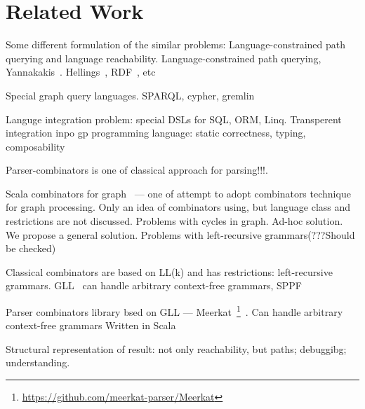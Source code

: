 \section{Related Work}

Some different formulation of the similar problems: Language-constrained path querying and language reachability.
Language-constrained path querying, Yannakakis~\cite{Yannakakis}. 
Hellings~\cite{ConjCFPathQuery, Hellings16}, RDF~\cite{CFGonRDF}, etc~\cite{QueryGraphWithData, RegularDBQuery, GraphQueryWithEarley, FLCpathProblem, graphDB}

Special graph query languages. SPARQL, cypher, gremlin

Languge integration problem: special DSLs for SQL, ORM, Linq.
Transperent integration inpo gp programming language: static correctness, typing, composability

Parser-combinators is one of classical approach for parsing!!!.

Scala combinators for graph~\cite{ScalaGraphParsing} --- one of attempt to adopt combinators 
technique for graph processing.
Only an idea of combinators using, but language class and restrictions are not discussed.
Problems with cycles in graph. 
Ad-hoc solution. We propose a general solution.
Problems with left-recursive grammars(???Should be checked)

Classical combinators are based on LL(k) and has restrictions: left-recursive grammars.
GLL~\cite{scott2010gll} can handle arbitrary context-free grammars, SPPF~\cite{SPPF}

Parser combinators library bsed on GLL --- 
Meerkat~\footnote{\url{https://github.com/meerkat-parser/Meerkat}}~\cite{Meerkat}. 
Can handle arbitrary context-free grammars
Written in Scala

Structural representation of result: not only reachability, but paths; debuggibg; understanding.